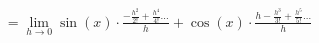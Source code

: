 \documentclass[preview]{standalone}
\begin{document}
\begin{align*}
= \lim_{h \to 0} \sin(x) \cdot \frac{- \frac{h^2}{2!} + \frac{h^4}{4!} \dots}{h} + \cos(x) \cdot \frac{h - \frac{h^3}{3!} + \frac{h^5}{5!} \dots}{h}
\end{align*}
\end{document}
